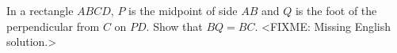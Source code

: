 \problem
In a rectangle $ABCD$, $P$ is the midpoint of side $AB$ and $Q$ is the foot of
the perpendicular from $C$ on $PD$. Show that $BQ = BC$.
\solution
<FIXME: Missing English solution.>
\endproblem
